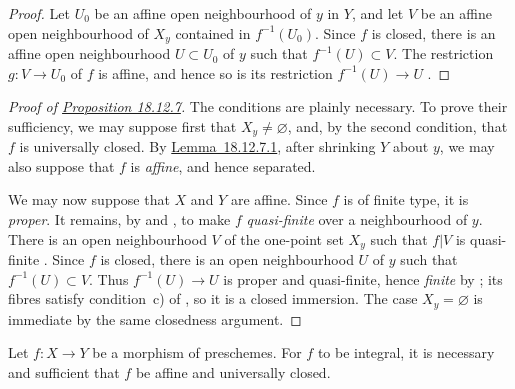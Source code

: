 \begin{proof}
Let $U_0$ be an affine open neighbourhood of $y$ in $Y$, and let $V$ be an affine open neighbourhood of $X_y$ contained in $f^{-1}(U_0)$. Since $f$ is closed, there is an affine open neighbourhood $U\subset U_0$ of $y$ such that $f^{-1}(U)\subset V$. The restriction $g:V\to U_0$ of $f$ is affine, and hence so is its restriction $f^{-1}(U)\to U$ .
\end{proof}

\begin{proof}[Proof of {\hyperref[IV.18.12.7]{Proposition 18.12.7}}]
The conditions are plainly necessary. To prove their sufficiency, we may suppose first that $X_y\ne\varnothing$, and, by the second condition, that $f$ is universally closed. By {\hyperref[IV.18.12.7.1]{Lemma~18.12.7.1}}, after shrinking $Y$ about $y$, we may also suppose that $f$ is \emph{affine}, and hence separated.

We may now suppose that $X$ and $Y$ are affine. Since $f$ is of finite type, it is \emph{proper}. It remains, by  and , to make $f$ \emph{quasi-finite} over a neighbourhood of $y$. There is an open neighbourhood $V$ of the one-point set $X_y$ such that $f|V$ is quasi-finite . Since $f$ is closed, there is an open neighbourhood $U$ of $y$ such that $f^{-1}(U)\subset V$. Thus $f^{-1}(U)\to U$ is proper and quasi-finite, hence \emph{finite} by ; its fibres satisfy condition~c) of , so it is a closed immersion. The case $X_y=\varnothing$ is immediate by the same closedness argument.
\end{proof}

\begin{proposition}[18.12.8]
\label{IV.18.12.8}
Let $f:X\to Y$ be a morphism of preschemes.
For $f$ to be integral, it is necessary and sufficient that $f$ be affine and universally closed.
\end{proposition}

